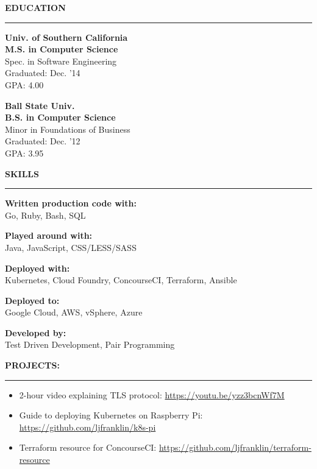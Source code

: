 \documentclass[a4paper,10pt]{article}
\newcommand{\header}[1]
{
\vspace{0.10in}
{\Large \textbf {\uppercase{#1}}}
\vspace{0.05in}
\hrule
\vspace{0.15in}
}
\newcommand{\spacer}{\vspace*{1\baselineskip}}
\newenvironment{details}
{\begin{itemize}[label=\scalebox{.5}{\ding{117}},leftmargin=0.15in]}
{\end{itemize}}
\begin{document}
\begin{minipage}[t]{0.35\textwidth}
\header{Education}

\textbf{Univ. of Southern California\\
M.S. in Computer Science\\}
Spec. in Software Engineering\\
Graduated: Dec. '14\\
GPA: 4.00
\spacer

\textbf{Ball State Univ.\\
B.S. in Computer Science\\}
Minor in Foundations of Business\\
Graduated: Dec. '12\\
GPA: 3.95

\spacer

\header{Skills}

\textbf{Written production code with:}\\
Go, Ruby, Bash, SQL

\spacer

\textbf{Played around with:}\\
Java, JavaScript, CSS/LESS/SASS

\spacer

\textbf{Deployed with:}\\
Kubernetes, Cloud Foundry, ConcourseCI, Terraform, Ansible

\spacer

\textbf{Deployed to:}\\
Google Cloud, AWS, vSphere, Azure

\spacer

\textbf{Developed by:}\\
Test Driven Development, Pair Programming

\spacer\spacer

\header{Projects:}
\begin{details}
  \item 2-hour video explaining TLS protocol: \url{https://youtu.be/yzz3bcnWf7M}
  \item Guide to deploying Kubernetes on Raspberry Pi: \url{https://github.com/ljfranklin/k8s-pi}
  \item Terraform resource for ConcourseCI: \url{https://github.com/ljfranklin/terraform-resource}
\end{details}

\end{minipage}
\end{document}
